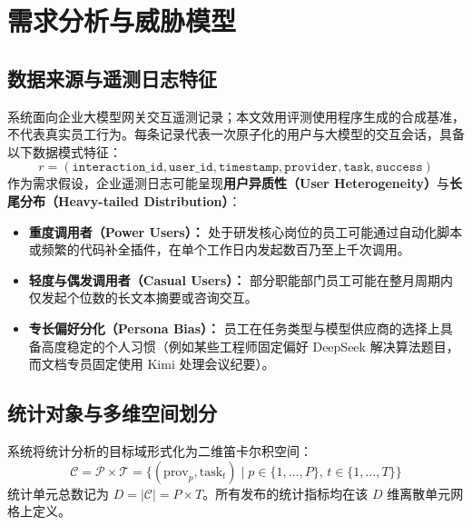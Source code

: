\section{需求分析与威胁模型}
\label{sec:threat_model}

\subsection{数据来源与遥测日志特征}
系统面向企业大模型网关交互遥测记录；本文效用评测使用程序生成的合成基准，不代表真实员工行为。每条记录代表一次原子化的用户与大模型的交互会话，具备以下数据模式特征：
\begin{equation}
  r = (\texttt{interaction\_id}, \texttt{user\_id}, \texttt{timestamp}, \texttt{provider}, \texttt{task}, \texttt{success})
\end{equation}
作为需求假设，企业遥测日志可能呈现\textbf{用户异质性（User Heterogeneity）}与\textbf{长尾分布（Heavy-tailed Distribution）}：
\begin{itemize}[leftmargin=2em]
  \item \textbf{重度调用者（Power Users）：} 处于研发核心岗位的员工可能通过自动化脚本或频繁的代码补全插件，在单个工作日内发起数百乃至上千次调用。
  \item \textbf{轻度与偶发调用者（Casual Users）：} 部分职能部门员工可能在整月周期内仅发起个位数的长文本摘要或咨询交互。
  \item \textbf{专长偏好分化（Persona Bias）：} 员工在任务类型与模型供应商的选择上具备高度稳定的个人习惯（例如某些工程师固定偏好 DeepSeek 解决算法题目，而文档专员固定使用 Kimi 处理会议纪要）。
\end{itemize}

\subsection{统计对象与多维空间划分}
系统将统计分析的目标域形式化为二维笛卡尔积空间：
\begin{equation}
  \mathcal{C} = \mathcal{P} \times \mathcal{T} = \{ (\text{prov}_p, \text{task}_t) \mid p \in \{1, \dots, P\}, \, t \in \{1, \dots, T\} \}
\end{equation}
统计单元总数记为 $D = |\mathcal{C}| = P \times T$。所有发布的统计指标均在该 $D$ 维离散单元网格上定义。

